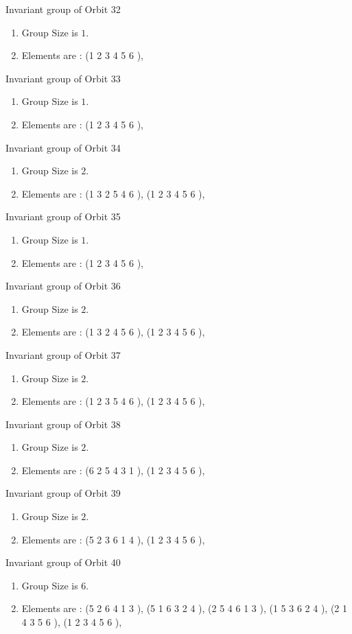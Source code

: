 \documentclass[12pt]{article}
\begin{document}
Invariant group of Orbit 32
\begin{enumerate}
\item Group Size is $1$.
\item Elements are : (1 2 3 4 5 6  ), 
\end{enumerate}
Invariant group of Orbit 33
\begin{enumerate}
\item Group Size is $1$.
\item Elements are : (1 2 3 4 5 6  ), 
\end{enumerate}
Invariant group of Orbit 34
\begin{enumerate}
\item Group Size is $2$.
\item Elements are : (1 3 2 5 4 6  ), (1 2 3 4 5 6  ), 
\end{enumerate}
Invariant group of Orbit 35
\begin{enumerate}
\item Group Size is $1$.
\item Elements are : (1 2 3 4 5 6  ), 
\end{enumerate}
Invariant group of Orbit 36
\begin{enumerate}
\item Group Size is $2$.
\item Elements are : (1 3 2 4 5 6  ), (1 2 3 4 5 6  ), 
\end{enumerate}
Invariant group of Orbit 37
\begin{enumerate}
\item Group Size is $2$.
\item Elements are : (1 2 3 5 4 6  ), (1 2 3 4 5 6  ), 
\end{enumerate}
Invariant group of Orbit 38
\begin{enumerate}
\item Group Size is $2$.
\item Elements are : (6 2 5 4 3 1  ), (1 2 3 4 5 6  ), 
\end{enumerate}
Invariant group of Orbit 39
\begin{enumerate}
\item Group Size is $2$.
\item Elements are : (5 2 3 6 1 4  ), (1 2 3 4 5 6  ), 
\end{enumerate}
Invariant group of Orbit 40
\begin{enumerate}
\item Group Size is $6$.
\item Elements are : (5 2 6 4 1 3  ), (5 1 6 3 2 4  ), (2 5 4 6 1 3  ), (1 5 3 6 2 4  ), (2 1 4 3 5 6  ), (1 2 3 4 5 6  ), 
\end{enumerate}
\end{document}
